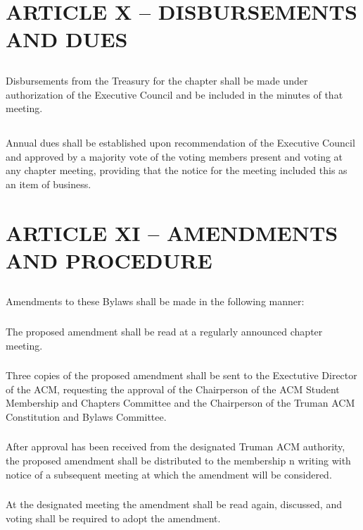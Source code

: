 \documentclass[12pt]{article}
\begin{document}
\section{ARTICLE X – DISBURSEMENTS AND DUES}
\subsection{}	Disbursements from the Treasury for the chapter shall be made under authorization of the Executive Council and be included in the minutes of that meeting.
\subsection{}	Annual dues shall be established upon recommendation of the Executive Council and approved by a majority vote of the voting members present and voting at any chapter meeting, providing that the notice for the meeting included this as an item of business.

\section{ARTICLE XI – AMENDMENTS AND PROCEDURE}
\subsection{}	Amendments to these Bylaws shall be made in the following manner:
\subsubsection{}	The proposed amendment shall be read at a regularly announced chapter meeting.
\subsubsection{}	Three copies of the proposed amendment shall be sent to the Exectutive Director of the ACM, requesting the approval of the Chairperson of the ACM Student Membership and Chapters Committee and the Chairperson of the Truman ACM Constitution and Bylaws Committee.
\subsubsection{}	After approval has been received from the designated Truman ACM authority, the proposed amendment shall be distributed to the membership n writing with notice of a subsequent meeting at which the amendment will be considered.
\subsubsection{}	At the designated meeting the amendment shall be read again, discussed, and voting shall be required to adopt the amendment.
\end{document}
